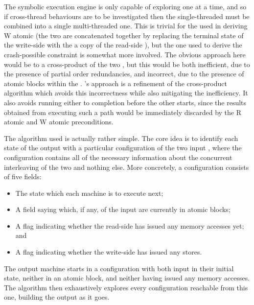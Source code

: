 The symbolic execution engine is only capable of exploring one
{\StateMachine} at a time, and so if cross-thread behaviours are to be
investigated then the single-threaded {\StateMachines} must be
combined into a single multi-threaded one.  This is trivial for the
{\StateMachine} used in deriving W atomic (the two {\StateMachines}
are concatenated together by replacing the terminal state of the
write-side {\StateMachine} with the a copy of the read-side
{\StateMachine}), but the one used to derive the crash-possible
constraint is somewhat more involved.  The obvious approach here would
be to a cross-product of the two {\StateMachines}, but this would be
both inefficient, due to the presence of partial order
redundancies\needCite{}, and incorrect, due to the presence of atomic
blocks within the {\StateMachines}.  {\Technique}'s approach is a
refinement of the cross-product algorithm which avoids this
incorrectness while also mitigating the inefficiency.  It also avoids
running either {\StateMachine} to completion before the other starts,
since the results obtained from executing such a path would be
immediately discarded by the R atomic and W atomic preconditions.


The algorithm used is actually rather simple.  The core idea is to
identify each state of the output {\StateMachine} with a particular
configuration of the two input {\StateMachines}, where the
configuration contains all of the necessary information about the
concurrent interleaving of the two {\StateMachines} and nothing else.
More concretely, a configuration consists of five fields:

\begin{itemize}
\item The {\StateMachine} state which each machine is to execute next;
\item A field saying which, if any, of the input {\StateMachines} are
  currently in atomic blocks;
\item A flag indicating whether the read-side {\StateMachine} has
  issued any memory accesses yet; and
\item A flag indicating whether the write-side {\StateMachine} has
  issued any stores.
\end{itemize}

The output machine starts in a configuration with both input
{\StateMachines} in their initial state, neither in an atomic block,
and neither having issued any memory accesses.  The algorithm then
exhaustively explores every configuration reachable from this one,
building the output {\StateMachine} as it goes.

